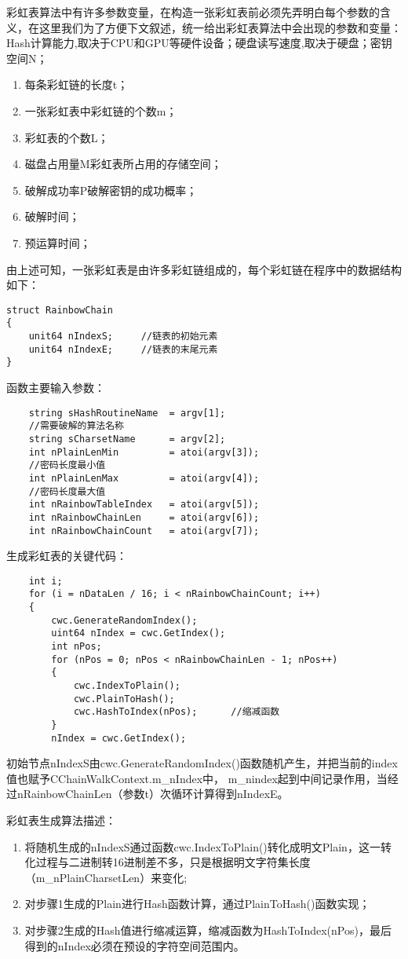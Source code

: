 彩虹表算法中有许多参数变量，在构造一张彩虹表前必须先弄明白每个参数的含义，在这里我们为了方便下文叙述，统一给出彩虹表算法中会出现的参数和变量：Hash计算能力,取决于CPU和GPU等硬件设备；硬盘读写速度,取决于硬盘；密钥空间N；
\begin{enumerate}
\item 每条彩虹链的长度t；
\item 一张彩虹表中彩虹链的个数m；
\item 彩虹表的个数L；
\item 磁盘占用量M\quad 彩虹表所占用的存储空间；
\item 破解成功率P\quad 破解密钥的成功概率；
\item 破解时间；
\item 预运算时间；
\end{enumerate}
由上述可知，一张彩虹表是由许多彩虹链组成的，每个彩虹链在程序中的数据结构如下：\\
\begin{lstlisting}
struct RainbowChain 
{
	unit64 nIndexS;		//链表的初始元素
	unit64 nIndexE;		//链表的末尾元素
}
\end{lstlisting}
函数主要输入参数：
\begin{lstlisting}
	string sHashRoutineName  = argv[1];	
	//需要破解的算法名称
	string sCharsetName      = argv[2];				
	int nPlainLenMin         = atoi(argv[3]);
	//密码长度最小值
	int nPlainLenMax         = atoi(argv[4]);
	//密码长度最大值
	int nRainbowTableIndex   = atoi(argv[5]);			
	int nRainbowChainLen     = atoi(argv[6]);			
	int nRainbowChainCount   = atoi(argv[7]);			
\end{lstlisting}
生成彩虹表的关键代码：
\begin{lstlisting}
	int i;
	for (i = nDataLen / 16; i < nRainbowChainCount; i++) 
	{
		cwc.GenerateRandomIndex();
		uint64 nIndex = cwc.GetIndex();
		int nPos;
		for (nPos = 0; nPos < nRainbowChainLen - 1; nPos++)
		{
			cwc.IndexToPlain();
			cwc.PlainToHash();
			cwc.HashToIndex(nPos);		//缩减函数
		}
		nIndex = cwc.GetIndex();

\end{lstlisting}

初始节点nIndexS由cwc.GenerateRandomIndex()函数随机产生，并把当前的index值也赋予CChainWalkContext.m\_nIndex中， m\_nindex起到中间记录作用，当经过nRainbowChainLen（参数t）次循环计算得到nIndexE。

彩虹表生成算法描述：
\begin{enumerate}
\item 将随机生成的nIndexS通过函数cwc.IndexToPlain()转化成明文Plain，这一转化过程与二进制转16进制差不多，只是根据明文字符集长度（m\_nPlainCharsetLen）来变化;
\item 对步骤1生成的Plain进行Hash函数计算，通过PlainToHash()函数实现；
\item 对步骤2生成的Hash值进行缩减运算，缩减函数为HashToIndex(nPos)，最后得到的nIndex必须在预设的字符空间范围内。
\end{enumerate}

